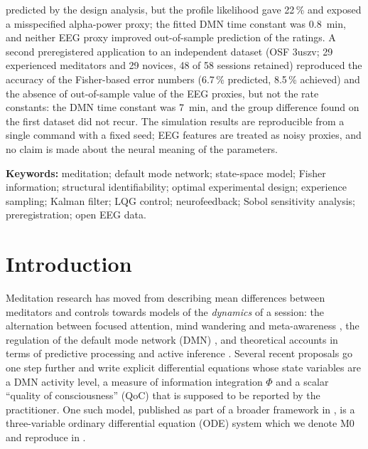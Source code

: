 \documentclass[12pt,a4paper]{article}
\theoremstyle{plain}
\theoremstyle{definition}
\theoremstyle{remark}
\begin{document}
\begin{tcolorbox}[mathbox,title=Abstract]
predicted by the design analysis, but the profile likelihood gave 22\,\% and exposed a misspecified alpha-power proxy; the fitted DMN time constant was 0.8~min, and neither EEG proxy improved out-of-sample prediction of the ratings. A second preregistered application to an independent dataset (OSF 3uszv; 29 experienced meditators and 29 novices, 48 of 58 sessions retained) reproduced the accuracy of the Fisher-based error numbers (6.7\,\% predicted, 8.5\,\% achieved) and the absence of out-of-sample value of the EEG proxies, but not the rate constants: the DMN time constant was 7~min, and the group difference found on the first dataset did not recur. The simulation results are reproducible from a single command with a fixed seed; EEG features are treated as noisy proxies, and no claim is made about the neural meaning of the parameters.
\end{tcolorbox}

\noindent\textbf{Keywords:} meditation; default mode network; state-space model; Fisher information; structural identifiability; optimal experimental design; experience sampling; Kalman filter; LQG control; neurofeedback; Sobol sensitivity analysis; preregistration; open EEG data.

\section{Introduction}
\label{sec:intro}

Meditation research has moved from describing mean differences between meditators and controls \citep{Brewer2011,Fox2016} towards models of the \emph{dynamics} of a session: the alternation between focused attention, mind wandering and meta-awareness \citep{Hasenkamp2012,Lutz2008,Christoff2016}, the regulation of the default mode network (DMN) \citep{Raichle2001,Brewer2011,Garrison2015}, and theoretical accounts in terms of predictive processing and active inference \citep{Laukkonen2021,SandvedSmith2021}. Several recent proposals go one step further and write explicit differential equations whose state variables are a DMN activity level, a measure of information integration $\Phi$ \citep{Tononi2004,Oizumi2014} and a scalar ``quality of consciousness'' (QoC) that is supposed to be reported by the practitioner. One such model, published as part of a broader framework in \citet{BQI}, is a three-variable ordinary differential equation (ODE) system which we denote M0 and reproduce in .
\end{document}
